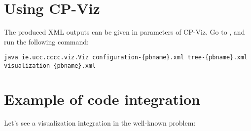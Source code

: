 \section{Using CP-Viz}\label{chocoandcpviz:codeintegration}\hypertarget{chocoandcpviz:codeintegration}{}

The produced XML outputs can be given in parameters of CP-Viz.  Go to , and run the following command:
\begin{lstlisting}
java ie.ucc.cccc.viz.Viz configuration-{pbname}.xml tree-{pbname}.xml visualization-{pbname}.xml
\end{lstlisting}

\section{Example of code integration}\label{chocoandcpviz:codeintegration}\hypertarget{chocoandcpviz:codeintegration}{}
Let's see a visualization integration in the well-known  problem:

